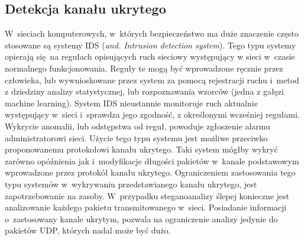 \documentclass[a4paper, twoside, openright, 12pt]{report}
\begin{document}
       \subsection{Detekcja kanału ukrytego}
       W~sieciach komputerowych, w~których bezpieczeństwo ma duże znaczenie często
       stosowane są systemy IDS (\emph{and. Intrusion detection system}). Tego typu
       systemy opierają się na regułach opisujących ruch sieciowy występujący w
       sieci w~czasie normalnego funkcjonowania. Reguły te mogą być wprowadzone ręcznie
       przez człowieka, lub wywnioskowane przez system za pomocą rejestracji ruchu i~metod z dziedziny
       analizy statystycznej, lub rozpoznawania wzorców (jedna z gałęzi machine learning)\cite{IDSDESCRIPTION}.
       System IDS nieustannie monitoruje ruch aktualnie występujący w~sieci i~sprawdza
       jego zgodność, z określonymi wcześniej regułami. Wykrycie anomalii, lub odstępstwa
       od reguł, powoduje zgłoszenie alarmu administratorowi sieci. Użycie tego
       typu systemu jest możliwe przeciwko proponowanemu protokołowi kanału ukrytego.
       Taki system mógłby wykryć zarówno opóźnienia jak i~modyfikacje długości
       pakietów w~kanale podstawowym wprowadzone przez protokół kanału ukrytego.
       Ograniczeniem zastosowania tego typu systemów w~wykrywaniu przedstawianego kanału
       ukrytego, jest zapotrzebowanie na zasoby. W~przypadku steganoanalizy ślepej
       konieczne jest analizowanie każdego pakietu transmitowanego w~sieci. Posiadanie
       informacji o~zastosowany kanale ukrytym, pozwala na ograniczenie analizy jedynie
       do pakietów UDP, których nadal może być dużo.
\end{document}
